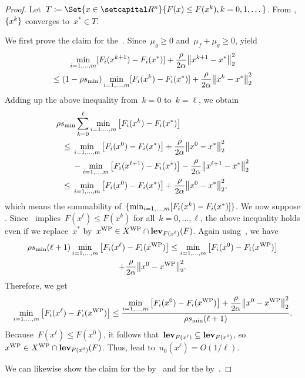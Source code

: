 \documentclass[../../main]{subfiles}
\begin{document}
\begin{proof}
    Let~$T \coloneqq \Set{x \in \setR^n}{F(x) \le F(x^k), k = 0, 1, \dots}$.
    From ,~$\lbrace x^k\rbrace$ converges to~$x^* \in T$.

    We first prove the claim for the~.
    Since~$\mu_g \ge 0$ and~$\mu_f + \mu_g \ge 0$,  yield
    \begin{multline}
        \min_{i = 1, \dots, m} [F_i(x^{k + 1}) - F_i(x^*)] + \frac{\rho}{2 \alpha} \norm*{x^{k + 1} - x^*}_2^2 \\
        \le (1 - \rho s_{\min}) \min_{i = 1, \dots, m} [F_i(x^k) - F_i(x^*)] + \frac{\rho}{2 \alpha} \norm*{x^k - x^*}_2^2
    \end{multline}
    Adding up the above inequality from~$k = 0$ to~$k = \ell$, we obtain
    \begin{align}
        \MoveEqLeft \rho s_{\min} \sum_{k = 0}^{\ell} \min_{i = 1, \dots, m} \left[F_i(x^k) - F_i(x^*)\right] \\
        \le{}& \min_{i = 1, \dots, m} \left[F_i(x^0) - F_i(x^*)\right] + \frac{\rho}{2 \alpha} \norm*{x^0 - x^*}_2^2 \\
             &- \min_{i = 1, \dots, m} \left[F_i(x^{\ell + 1}) - F_i(x^*)\right] - \frac{\rho}{2 \alpha} \norm*{x^{\ell + 1} - x^*}_2^2 \\
        \le{}& \min_{i = 1, \dots, m} \left[F_i(x^0) - F_i(x^*)\right] + \frac{\rho}{2 \alpha} \norm*{x^0 - x^*}_2^2
    ,\end{align}
    which means the summability of~$\lbrace\min_{i = 1, \dots, m} [F_i(x^k) - F_i(x^*)]\rbrace$.
    We now suppose .
    Since~ implies~$F(x^\ell) \le F(x^k)$ for all~$k = 0, \dots, \ell$, the above inequality holds even if we replace~$x^*$ by~$x^{\text{WP}} \in X^{\text{WP}} \cap \operatorname{\mathbf{lev}}_{F(x^\ell)}(F)$.
    Again using~, we have
    \begin{multline}
        \rho s_{\min} (\ell + 1) \min_{i = 1, \dots, m} \left[ F_i(x^\ell) - F_i(x^{\text{WP}}) \right] \le \min_{i = 1, \dots, m} \left[F_i(x^0) - F_i(x^{\text{WP}})\right] \\
        + \frac{\rho}{2 \alpha} \norm*{x^0 - x^{\text{WP}}}_2^2
    .\end{multline}
    Therefore, we get
    \begin{equation}
        \min_{i = 1, \dots, m} \left[ F_i(x^\ell) - F_i(x^{\text{WP}}) \right] \le \frac{\displaystyle \min_{i = 1, \dots, m} \left[F_i(x^0) - F_i(x^{\text{WP}})\right] + \frac{\rho}{2 \alpha} \norm*{x^0 - x^{\text{WP}}}_2^2
}{\rho s_{\min} (\ell + 1)} 
    .\end{equation}
    Because~$F(x^\ell) \le F(x^0)$, it follows that~$\operatorname{\mathbf{lev}}_{F(x^\ell)} \subseteq \operatorname{\mathbf{lev}}_{F(x^0)}$, so~$x^{\text{WP}} \in X^{\text{WP}} \cap \operatorname{\mathbf{lev}}_{F(x^0)}(F)$.
    Thus,  lead to~$u_0(x^\ell) = O(1 / \ell)$.

    We can likewise show the claim for the  by~ and for the  by~.
\end{proof}
\end{document}
